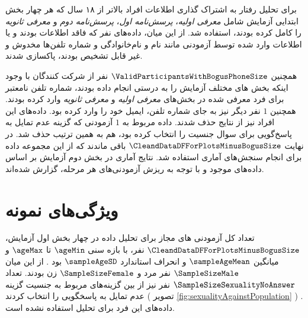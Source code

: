 % 

برای تحلیل رفتار به اشتراک گذاری اطلاعات افراد بالاتر از ۱۸ سال که هر چهار بخش ابتدایی آزمایش شامل
\textit{معرفی اولیه}،
\textit{پرسش‌نامه اول}،
\textit{پرسش‌نامه دوم} و
\textit{معرفی ثانویه}
را کامل کرده بودند، استفاده شد.
از این میان، داده‌های
\BogusEmailDataBogusNoLandingPageDateData
نفر
که فاقد اطلاعات بودند و یا اطلاعات وارد شده توسط آزمودنی
مانند نام و نام‌خانوادگی و شماره تلفن‌ها مخدوش و غیر قابل تشخیص بودند، پاکسازی شدند.

همچنین
$\ValidParticipantsWithBogusPhoneSize$
نفر  از شرکت کنندگان با وجود اینکه
بخش های مختلف آزمایش را به درستی انجام داده بودند، شماره تلفن نامعتبر
برای فرد معرفی شده در بخش‌های
\textit{معرفی اولیه}
و
\textit{معرفی ثانویه}
وارد کرده بودند. همچنین
$1$
نفر دیگر نیز به جای شماره تلفن، ایمیل خود را وارد کرده بود. داده‌های این افراد نیز از نتایج حذف شدند.
داده مربوط به
$1$
آزمودنی که گزینه عدم تمایل به پاسخ‌گویی برای سوال جنسیت را انتخاب کرده بود، هم به همین ترتیب حذف شد.
در نهایت
$\CleandDataDFForPlotsMinusBogusSize$
باقی ماندند که از این مجموعه داده برای انجام سنجش‌های آماری استفاده شد.
نتایج آماری در بخش دوم آزمایش بر اساس داده‌های موجود و با توجه به ریزش آزمودنی‌های هر مرحله، گزارش شده‌اند.
\section{ویژگی‌های نمونه}
تعداد کل آزمودنی های مجاز برای تحلیل داده در چهار بخش اول آزمایش،
$\CleandDataDFForPlotsMinusBogusSize$
نفر،
با بازه سنی
$\ageMin$
تا
$\ageMax$
و
میانگین
$\sampleAgeMean$
و انحراف استاندارد
$\sampleAgeSD$
بود
\!.
از این میان
$\SampleSizeMale$
نفر مرد و
$\SampleSizeFemale$
زن بودند.
تعداد
$\SampleSizeSexualityNoAnswer$
نفر
نیز از بین گزینه‌های مربوط به جنسیت گزینه عدم تمایل به پاسخگویی را انتخاب کردند
(
تصویر \ref{fig:sexualityAgainstPopulation}
)
\!.
داده‌های این فرد برای تحلیل‌ استفاده نشده است.


